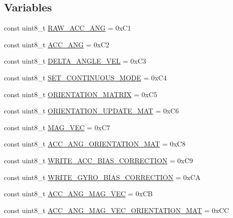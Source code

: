 \subsection*{\-Variables}
\begin{DoxyCompactItemize}
\item 
const uint8\-\_\-t \hyperlink{namespace_u_s_u_a6bbb473161195a7e10d9f821cece1b04}{\-R\-A\-W\-\_\-\-A\-C\-C\-\_\-\-A\-N\-G} = 0x\-C1
\item 
const uint8\-\_\-t \hyperlink{namespace_u_s_u_a0517f100ec98a93fb28d4ae52a943b19}{\-A\-C\-C\-\_\-\-A\-N\-G} = 0x\-C2
\item 
const uint8\-\_\-t \hyperlink{namespace_u_s_u_acaafc8eff5346d9c529238dd0ceb61a6}{\-D\-E\-L\-T\-A\-\_\-\-A\-N\-G\-L\-E\-\_\-\-V\-E\-L} = 0x\-C3
\item 
const uint8\-\_\-t \hyperlink{namespace_u_s_u_a1f3d4b142078bc61d7dea5676b399d29}{\-S\-E\-T\-\_\-\-C\-O\-N\-T\-I\-N\-U\-O\-U\-S\-\_\-\-M\-O\-D\-E} = 0x\-C4
\item 
const uint8\-\_\-t \hyperlink{namespace_u_s_u_a6bab14d28c02be2a8956e98d18b9b275}{\-O\-R\-I\-E\-N\-T\-A\-T\-I\-O\-N\-\_\-\-M\-A\-T\-R\-I\-X} = 0x\-C5
\item 
const uint8\-\_\-t \hyperlink{namespace_u_s_u_a9d3464edac1b198f5c02658b36d083bb}{\-O\-R\-I\-E\-N\-T\-A\-T\-I\-O\-N\-\_\-\-U\-P\-D\-A\-T\-E\-\_\-\-M\-A\-T} = 0x\-C6
\item 
const uint8\-\_\-t \hyperlink{namespace_u_s_u_a85ca84f12076e3251addb0c96317c83a}{\-M\-A\-G\-\_\-\-V\-E\-C} = 0x\-C7
\item 
const uint8\-\_\-t \hyperlink{namespace_u_s_u_a13f66b9f78d1a3e9778bce391ab41b5e}{\-A\-C\-C\-\_\-\-A\-N\-G\-\_\-\-O\-R\-I\-E\-N\-T\-A\-T\-I\-O\-N\-\_\-\-M\-A\-T} = 0x\-C8
\item 
const uint8\-\_\-t \hyperlink{namespace_u_s_u_a16dfbf07cc906050d4685de10f84c3d8}{\-W\-R\-I\-T\-E\-\_\-\-A\-C\-C\-\_\-\-B\-I\-A\-S\-\_\-\-C\-O\-R\-R\-E\-C\-T\-I\-O\-N} = 0x\-C9
\item 
const uint8\-\_\-t \hyperlink{namespace_u_s_u_a7e0bd6ee510ca1a1aded8b277a6c5c6a}{\-W\-R\-I\-T\-E\-\_\-\-G\-Y\-R\-O\-\_\-\-B\-I\-A\-S\-\_\-\-C\-O\-R\-R\-E\-C\-T\-I\-O\-N} = 0x\-C\-A
\item 
const uint8\-\_\-t \hyperlink{namespace_u_s_u_ad03e7c0f41fd47a68a9f33abde73932a}{\-A\-C\-C\-\_\-\-A\-N\-G\-\_\-\-M\-A\-G\-\_\-\-V\-E\-C} = 0x\-C\-B
\item 
const uint8\-\_\-t \hyperlink{namespace_u_s_u_adb9724de65ce9a212dd8611f69d241f0}{\-A\-C\-C\-\_\-\-A\-N\-G\-\_\-\-M\-A\-G\-\_\-\-V\-E\-C\-\_\-\-O\-R\-I\-E\-N\-T\-A\-T\-I\-O\-N\-\_\-\-M\-A\-T} = 0x\-C\-C

\end{DoxyCompactItemize}
